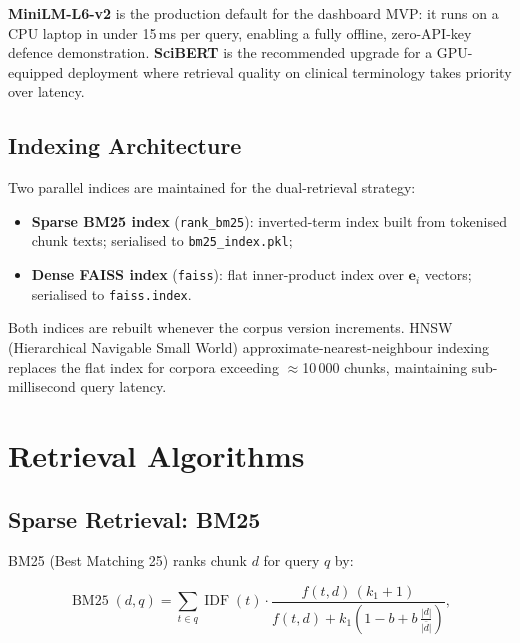 \textbf{MiniLM-L6-v2} is the production default for the dashboard MVP: it runs on
a CPU laptop in under 15\,ms per query, enabling a fully offline, zero-API-key
defence demonstration. \textbf{SciBERT} is the recommended upgrade for a
GPU-equipped deployment where retrieval quality on clinical terminology takes
priority over latency.

\subsection{Indexing Architecture}
\label{sec:rag-index}

Two parallel indices are maintained for the dual-retrieval strategy:

\begin{itemize}[noitemsep]
  \item \textbf{Sparse BM25 index} (\texttt{rank\_bm25}): inverted-term index
        built from tokenised chunk texts; serialised to
        \texttt{bm25\_index.pkl};
  \item \textbf{Dense FAISS index} (\texttt{faiss}): flat inner-product index
        over $\mathbf{e}_i$ vectors; serialised to \texttt{faiss.index}.
\end{itemize}

Both indices are rebuilt whenever the corpus version increments. HNSW
(Hierarchical Navigable Small World) approximate-nearest-neighbour indexing
replaces the flat index for corpora exceeding $\approx$10\,000 chunks, maintaining
sub-millisecond query latency.

\section{Retrieval Algorithms}
\label{sec:rag-ret-full}

\subsection{Sparse Retrieval: BM25}
\label{sec:rag-bm25}

BM25 (Best Matching 25) ranks chunk $d$ for query $q$ by:

\begin{equation}
\label{eq:bm25-rag}
\operatorname{BM25}(d,q) =
\sum_{t\in q} \operatorname{IDF}(t)\cdot
\frac{f(t,d)\,(k_1+1)}{f(t,d)+k_1\!\left(1-b+b\,\tfrac{|d|}{\bar{|d|}}\right)},
\end{equation}

